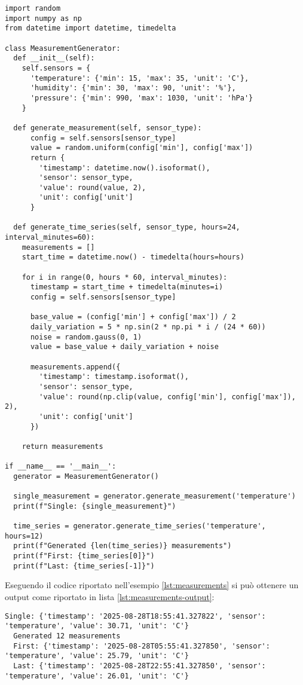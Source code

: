 \begin{lstlisting}[caption={Generazione di misurazioni aleatorie in Python}, label=lst:measurements]
import random
import numpy as np
from datetime import datetime, timedelta

class MeasurementGenerator:
  def __init__(self):
    self.sensors = {
      'temperature': {'min': 15, 'max': 35, 'unit': 'C'},
      'humidity': {'min': 30, 'max': 90, 'unit': '%'},
      'pressure': {'min': 990, 'max': 1030, 'unit': 'hPa'}
    }

  def generate_measurement(self, sensor_type):
      config = self.sensors[sensor_type]
      value = random.uniform(config['min'], config['max'])
      return {
        'timestamp': datetime.now().isoformat(),
        'sensor': sensor_type,
        'value': round(value, 2),
        'unit': config['unit']
      }

  def generate_time_series(self, sensor_type, hours=24, interval_minutes=60):
    measurements = []
    start_time = datetime.now() - timedelta(hours=hours)

    for i in range(0, hours * 60, interval_minutes):
      timestamp = start_time + timedelta(minutes=i)
      config = self.sensors[sensor_type]

      base_value = (config['min'] + config['max']) / 2
      daily_variation = 5 * np.sin(2 * np.pi * i / (24 * 60))
      noise = random.gauss(0, 1)
      value = base_value + daily_variation + noise

      measurements.append({
        'timestamp': timestamp.isoformat(),
        'sensor': sensor_type,
        'value': round(np.clip(value, config['min'], config['max']), 2),
        'unit': config['unit']
      })

    return measurements

if __name__ == '__main__':
  generator = MeasurementGenerator()

  single_measurement = generator.generate_measurement('temperature')
  print(f"Single: {single_measurement}")

  time_series = generator.generate_time_series('temperature', hours=12)
  print(f"Generated {len(time_series)} measurements")
  print(f"First: {time_series[0]}")
  print(f"Last: {time_series[-1]}")
\end{lstlisting}

Eseguendo il codice riportato nell'esempio \ref{lst:measurements} si può ottenere un output come riportato
in lista \ref{lst:measurements-output}:
\begin{lstlisting}[caption={Output di esempio ottenuto dalla generazione di misurazioni aleatorie in Python},
  label=lst:measurements-output]
  Single: {'timestamp': '2025-08-28T18:55:41.327822', 'sensor': 'temperature', 'value': 30.71, 'unit': 'C'}
  Generated 12 measurements
  First: {'timestamp': '2025-08-28T05:55:41.327850', 'sensor': 'temperature', 'value': 25.79, 'unit': 'C'}
  Last: {'timestamp': '2025-08-28T22:55:41.327850', 'sensor': 'temperature', 'value': 26.01, 'unit': 'C'}
\end{lstlisting}

